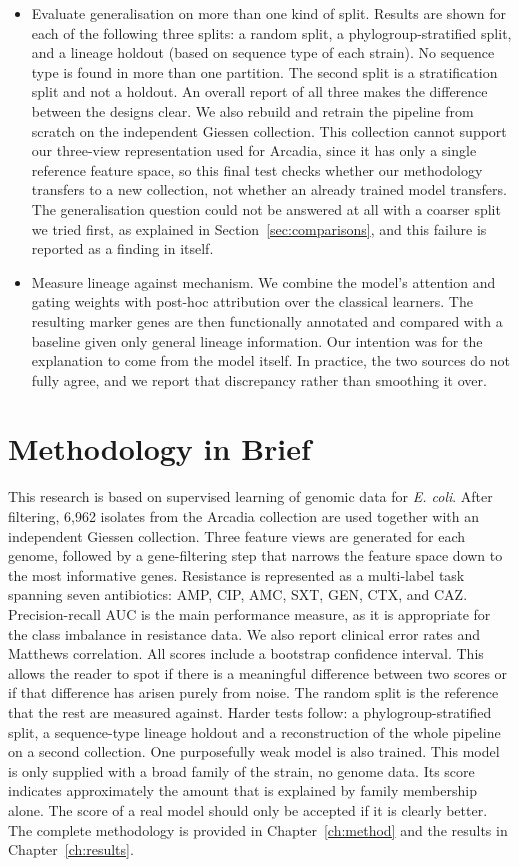 \begin{itemize}
    \item Evaluate generalisation on more than one kind of split. Results are shown for each of the following three splits: a random split, a phylogroup-stratified split, and a lineage holdout (based on sequence type of each strain). No sequence type is found in more than one partition. The second split is a stratification split and not a holdout. An overall report of all three makes the difference between the designs clear. We also rebuild and retrain the pipeline from scratch on the independent Giessen collection. This collection cannot support our three-view representation used for Arcadia, since it has only a single reference feature space, so this final test checks whether our methodology transfers to a new collection, not whether an already trained model transfers. The generalisation question could not be answered at all with a coarser split we tried first, as explained in Section~\ref{sec:comparisons}, and this failure is reported as a finding in itself.

    \item Measure lineage against mechanism. We combine the model's attention and gating weights with post-hoc attribution over the classical learners. The resulting marker genes are then functionally annotated and compared with a baseline given only general lineage information. Our intention was for the explanation to come from the model itself. In practice, the two sources do not fully agree, and we report that discrepancy rather than smoothing it over.
\end{itemize}

\section{Methodology in Brief}
This research is based on supervised learning of genomic data for \textit{E. coli}. After filtering, 6,962 isolates from the Arcadia collection are used together with an independent Giessen collection. Three feature views are generated for each genome, followed by a gene-filtering step that narrows the feature space down to the most informative genes. Resistance is represented as a multi-label task spanning seven antibiotics: AMP, CIP, AMC, SXT, GEN, CTX, and CAZ. Precision-recall AUC is the main performance measure, as it is appropriate for the class imbalance in resistance data. We also report clinical error rates and Matthews correlation. All scores include a bootstrap confidence interval. This allows the reader to spot if there is a meaningful difference between two scores or if that difference has arisen purely from noise. The random split is the reference that the rest are measured against. Harder tests follow: a phylogroup-stratified split, a sequence-type lineage holdout and a reconstruction of the whole pipeline on a second collection. One purposefully weak model is also trained. This model is only supplied with a broad family of the strain, no genome data. Its score indicates approximately the amount that is explained by family membership alone. The score of a real model should only be accepted if it is clearly better. The complete methodology is provided in Chapter~\ref{ch:method} and the results in Chapter~\ref{ch:results}.

